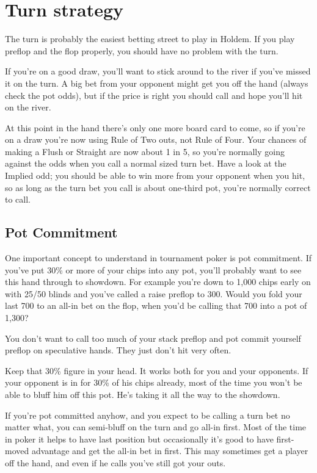 \chapter{Turn strategy}


The turn is probably the easiest betting street to play in Holdem.
If you play preflop and the flop properly, you should have no
problem with the turn.

If you're on a good draw, you'll want to stick around to
the river if you've missed it on the turn. A big bet from your opponent
might get you off the hand (always check the pot odds), but if the price
is right you should call and hope you'll hit on the river.

At this point in the hand there's only one more board card to come,
so if you're on a draw you're now
using Rule of Two outs, not Rule of Four. Your chances of making
a Flush or Straight are now about 1 in 5, so you're normally going
against the odds when you call a normal sized turn bet. Have a look
at the Implied odd; you should be able to win more from your opponent
when you hit, so as long as the turn bet you call is about one-third pot,
you're normally correct to call.

\section{Pot Commitment}

One important concept to understand in tournament poker is pot
commitment. If you've put 30\% or more of your chips into any pot,
you'll probably want to see this hand through to showdown. For
example you're down to 1,000 chips early on with 25/50 blinds and you've
called a raise preflop to 300. Would you fold your last 700 to
an all-in bet on the flop, when you'd be calling that 700 into a
pot of 1,300?

You don't want to call too much of your stack preflop and
pot commit yourself preflop on speculative hands. They just don't
hit very often.

Keep that 30\% figure in your head. It works both
for you and your opponents. If your opponent is in for 30\% of his
chips already, most of the time you won't be able to bluff him off
this pot. He's taking it all the way to the showdown.

If you're pot committed anyhow, and you expect to be calling a turn
bet no matter what, you can semi-bluff on the turn and go all-in first.
Most of the time in poker it helps to have last position but occasionally
it's good to have first-moved advantage and get the all-in bet in first.
This may sometimes get a player 
off the hand, and even if he calls you've still got your outs.

